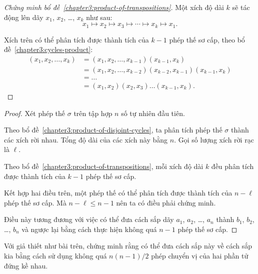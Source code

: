 \documentclass[class=nhvh-linear-algebra,crop=false]{standalone}
\begin{document}
\begin{proof}[Chứng minh bổ đề~\ref{chapter3:product-of-transpositions}]
	\par Một xích độ dài $k$ sẽ tác động lên dãy $x_{1}$, $x_{2}$, \ldots, $x_{k}$ như sau:
	\[
		x_{1}\mapsto x_{2} \mapsto x_{3} \mapsto \cdots \mapsto x_{k} \mapsto x_{1}.
	\]
	\par Xích trên có thể phân tích được thành tích của $k - 1$ phép thế sơ cấp, theo bổ đề~\ref{chapter3:cycles-product}:
	\begin{align*}
		(x_{1}, x_{2}, \ldots, x_{k}) & = (x_{1}, x_{2}, \ldots, x_{k-1})(x_{k-1}, x_{k})                   \\
		                              & = (x_{1}, x_{2}, \ldots, x_{k-2})(x_{k-2}, x_{k-1})(x_{k-1}, x_{k}) \\
		                              & = \ldots                                                            \\
		                              & = (x_{1}, x_{2})(x_{2}, x_{3})\ldots (x_{k-1}, x_{k}).
	\end{align*}
\end{proof}

\begin{proof}
	\par Xét phép thế $\sigma$ trên tập hợp $n$ số tự nhiên đầu tiên.
	\par Theo bổ đề~\ref{chapter3:product-of-disjoint-cycles}, ta phân tích phép thế $\sigma$ thành các xích rời nhau. Tổng độ dài của các xích này bằng $n$. Gọi số lượng xích rời rạc là $\ell$.
	\par Theo bổ đề~\ref{chapter3:product-of-transpositions}, mỗi xích độ dài $k$ đều phân tích được thành tích của $k-1$ phép thế sơ cấp.
	\par Kết hợp hai điều trên, một phép thế có thể phân tích được thành tích của $n - \ell$ phép thế sơ cấp. Mà $n - \ell \le n - 1$ nên ta có điều phải chứng minh.
	\par Điều này tương đương với việc có thể đưa cách sắp dãy $a_{1}$, $a_{2}$, \ldots, $a_{n}$ thành $b_{1}$, $b_{2}$, \ldots, $b_{n}$ và ngược lại bằng cách thực hiện không quá $n - 1$ phép thế sơ cấp.
\end{proof}

\begin{exercise}
	Với giả thiết như bài trên, chứng minh rằng có thể đưa cách sắp này về cách sắp kia bằng cách sử dụng không quá $n(n-1)/2$ phép chuyển vị của hai phần tử đứng kề nhau.
\end{exercise}
\end{document}
